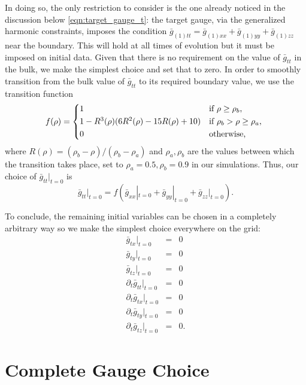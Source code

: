 \documentclass[a4paper,11pt]{article}
\numberwithin{equation}{section}
\begin{document}
In doing so, the only restriction to consider is the one already noticed in the discussion below \eqref{eqn:target_gauge_t}: the target gauge, via the generalized harmonic constraints, imposes the condition $\bar{g}_{(1)tt}=\bar{g}_{(1)xx}+\bar{g}_{(1)yy}+\bar{g}_{(1)zz}$ near the boundary. This will hold at all times of evolution but it must be imposed on initial data. Given that there is no requirement on the value of $\bar{g}_{tt}$ in the bulk, we make the simplest choice and set that to zero. In order to smoothly transition from the bulk value of $\bar{g}_{tt}$ to its required boundary value, we use the transition function
  \begin{equation}
  \label{eq:transfunc}
    f(\rho) =
    \begin{cases*}
      1 & if $\rho\geq \rho_{b}$, \\
      1-R^3(\rho)(6 R^2(\rho)-15 R(\rho)+10) & if $\rho_{b} > \rho\geq\rho_{a}$, \\
      0        & otherwise,
    \end{cases*}
  \end{equation}
where $R(\rho)=(\rho_{b}-\rho)/(\rho_{b}-\rho_{a})$ and $\rho_{a},\rho_{b}$ are the values between which the transition takes place, set to $\rho_{a}=0.5,\rho_{b}=0.9$ in our simulations.
Thus, our choice of $\bar{g}_{tt}|_{t=0}$ is
\begin{equation}
\bar{g}_{tt}|_{t=0}=f(\bar{g}_{xx}|_{t=0}+\bar{g}_{yy}|_{t=0}+\bar{g}_{zz}|_{t=0}).
\end{equation}

To conclude, the remaining initial variables can be chosen in a completely arbitrary way so we make the simplest choice everywhere on the grid:
\begin{eqnarray}
\bar{g}_{t x}|_{t=0}&=&0 \\
\bar{g}_{t y}|_{t=0}&=&0 \\
\bar{g}_{t z}|_{t=0}&=&0\\
\partial_t\bar{g}_{t t}|_{t=0}&=&0 \\
\partial_t\bar{g}_{t x}|_{t=0}&=&0\\
\partial_t\bar{g}_{t y}|_{t=0}&=&0\\
\partial_t\bar{g}_{t z}|_{t=0}&=&0.
\end{eqnarray}

\section{Complete Gauge Choice}
\label{sec:GCbulk}
\end{document}
